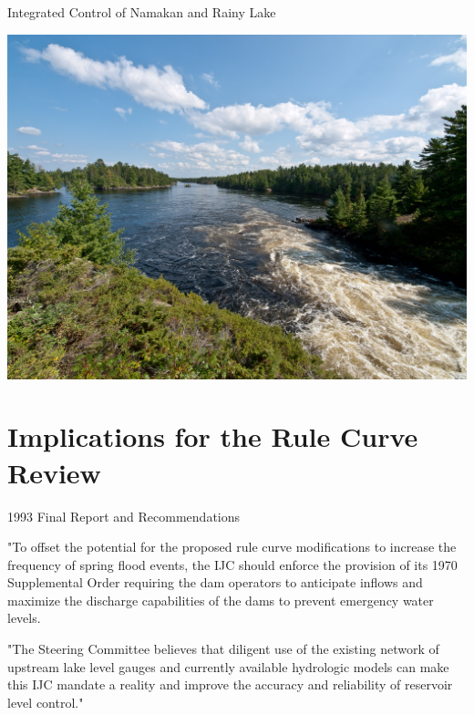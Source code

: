 \documentclass[compress,english]{beamer}
\begin{document}
{{{{\begin{frame}{Integrated Control of Namakan and Rainy Lake}

\end{frame}


{\usebackgroundtemplate%
	{\includegraphics[height=\paperheight]{KettleChannel.jpg}}
\section{Implications for the Rule Curve Review}
}

\begin{frame}{1993 Final Report and Recommendations}

"{\color{red}To offset the potential for the proposed rule curve modifications to increase the frequency of spring flood events}, the IJC should enforce the provision of its 1970 Supplemental Order {\color{red} requiring the dam operators to anticipate inflows and maximize the discharge capabilities of the dams to prevent emergency water levels}. 

"The Steering Committee believes that {\color{red} diligent use of the existing network of upstream lake level gauges and currently available hydrologic models can make this IJC mandate a reality and improve the accuracy and reliability of reservoir level control}." 


\end{frame}}}}}
\end{document}
